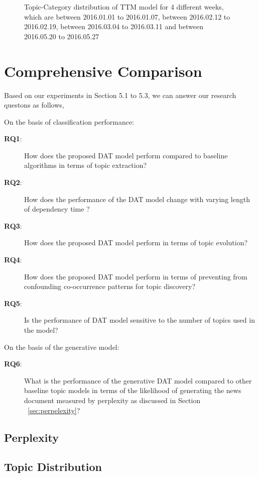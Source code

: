 \begin{figure}[!t]
\caption{\small Topic-Category distribution of TTM model for 4 different weeks, which are between 2016.01.01 to 2016.01.07, between 2016.02.12 to 2016.02.19, between 2016.03.04 to 2016.03.11 and between 2016.05.20 to 2016.05.27}
\label{fig:tottopiccategory}
\end{figure}

\section{Comprehensive Comparison}
Based on our experiments in Section 5.1 to 5.3, we can answer our research questons as follows,
\begin{description}
	\item On the basis of classification performance:
	\begin{description}
	\item[\textbf{RQ1}:] How does the proposed DAT model perform compared to baseline algorithms in terms of topic extraction? %
	\item[\textbf{RQ2}:] How does the performance of the DAT model change with varying length of dependency time ?
	\item[\textbf{RQ3}:] How does the proposed DAT model perform in terms of topic evolution? %
	\item[\textbf{RQ4}:] How does the proposed DAT model perform in terms of preventing from confounding co-occurrence patterns for topic discovery? %
	\item[\textbf{RQ5}:] Is the performance of DAT model sensitive to the number of topics used in the model? %
	\end{description}
	\item On the basis of the generative model:
	\begin{description}
	\item[\textbf{RQ6}:] What is the performance of the generative DAT model compared to other baseline topic models in terms of the likelihood of generating the news document measured by perplexity as discussed in Section ~\ref{sec:perpelexity}?
	\end{description}
\end{description}
\subsection{Perplexity}
\subsection{Topic Distribution}





